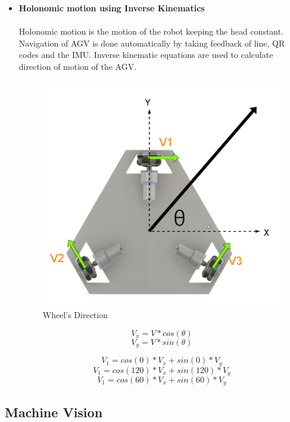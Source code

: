 \begin{itemize}[wide, labelwidth=!, labelindent=0pt]
    \newpage
    
    \item \textbf{Holonomic motion using Inverse Kinematics}
    \vspace{-0.5cm}
    \paragraph{}Holonomic motion is the motion of the robot keeping the head constant. Navigation of AGV is done automatically by taking feedback of line, QR codes and the IMU. Inverse kinematic equations are used to calculate direction of motion of the AGV.
    
    \begin{figure}[H]
    \centering
    \includegraphics[width = 13cm]{project/images/holonomic.png}
    \caption{Wheel's Direction}
    \end{figure}
    
    $$V_x = V * cos(\theta)$$
    $$V_y = V * sin(\theta)$$
    
    $$V_1 = cos(0)*V_x + sin(0)*V_y$$
    $$V_1 = cos(120)*V_x + sin(120)*V_y$$
    $$V_1 = cos(60)*V_x + sin(60)*V_y$$

\end{itemize}

\newpage
\subsection{Machine Vision}

